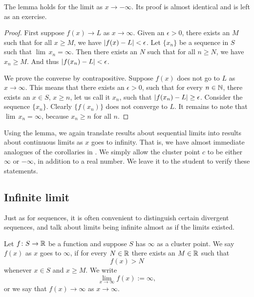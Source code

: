 The lemma holds for the limit as $x \to -\infty$.
Its proof is almost identical and
is left as an exercise.

\begin{proof}
First suppose $f(x) \to L$ as $x \to \infty$.
Given an $\epsilon > 0$, there exists an $M$ such that for all $x \geq M$,
we have $\left\lvert {f(x)-L} \right\rvert < \epsilon$.
Let $\{ x_n \}$
be a sequence in $S$ such that $\lim \, x_n = \infty$.  Then there exists an
$N$ such that for all $n \geq N$, we have $x_n \geq M$.  And thus
$\left\lvert {f(x_n)-L} \right\rvert < \epsilon$.

We prove the converse by contrapositive.  Suppose $f(x)$ does
not go to $L$ as $x \to \infty$.
This means that there exists an $\epsilon > 0$,
such that for every $n \in {\mathbb{N}}$, there exists an $x \in S$, $x \geq n$, let
us call it $x_n$, such that $\left\lvert {f(x_n)-L} \right\rvert \geq \epsilon$.
Consider the sequence $\{ x_n \}$.  Clearly 
$\{ f(x_n) \}$ does not converge to $L$.  It remains to note
that $\lim\, x_n = \infty$, because $x_n \geq n$ for all $n$.
\end{proof}

Using the lemma, we again translate results about sequential
limits into results about continuous limits as $x$ goes to infinity.  That
is, we have almost immediate analogues of the corollaries
in .  We simply allow 
the cluster point $c$ to be either $\infty$ or $-\infty$, in addition
to a real number.  We leave it to
the student to verify these statements.

\subsection{Infinite limit}

Just as for sequences, it is often convenient to distinguish certain
divergent sequences, and talk about limits being infinite
almost as if the limits existed.

\begin{defn}
%
Let $f \colon S \to {\mathbb{R}}$ be a function and suppose 
$S$ has $\infty$ as a cluster point.
We say $f(x)$
\emph{} 
as $x$ goes to $\infty$,
if for every $N \in {\mathbb{R}}$
there exists an $M \in {\mathbb{R}}$ such that
\begin{equation*}
f(x) > N
\end{equation*}
whenever $x \in S$ and $x \geq M$.
We write
\begin{equation*}
\lim_{x \to \infty} f(x) := \infty ,
\end{equation*}
or we say that $f(x) \to \infty$ as $x \to \infty$.
\end{defn}


